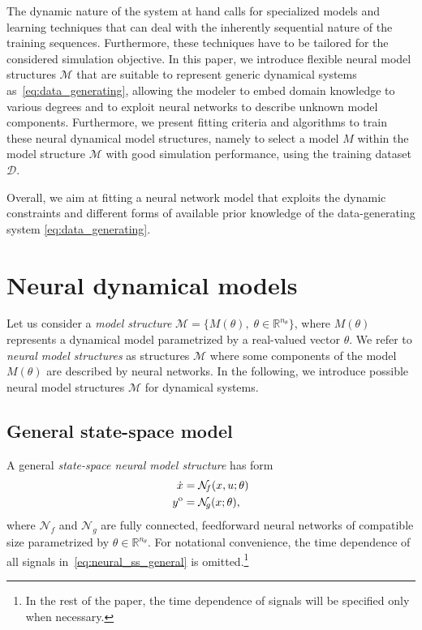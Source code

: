 \documentclass{article} %
\newcommand{\M}{{M}}             %
\newcommand{\MS}{\mathcal{M}}    %
\newcommand{\NN}{\mathcal{N}} %
\newcommand{\ntheta}{n_\theta}
\newcommand{\Did}{{\mathcal{D}}}
\newcommand{\ymodel}{y^{\rm o}}
\begin{document}
{The dynamic nature of the system at hand calls for specialized models and learning techniques that can deal with the inherently sequential nature of the training sequences. Furthermore, these techniques have to be tailored for the considered simulation objective}. In this paper, we introduce flexible neural model structures {$\mathcal{M}$} that are suitable to represent generic dynamical systems as~\eqref{eq:data_generating}, allowing the modeler to embed domain knowledge to various degrees and to exploit neural networks to describe unknown model components.
Furthermore, we present fitting criteria and algorithms to train these neural dynamical model structures, {namely to select a model $M$ within the model structure $\mathcal{M}$ with good simulation performance, using the training dataset $\Did$.}
 
Overall, we aim at fitting a neural network model that exploits the dynamic constraints and different forms of available prior  knowledge of the data-generating system \eqref{eq:data_generating}. 


\section{Neural dynamical models}
\label{sec:model_structure}
Let us consider a  \textit{model structure} $\MS = \{\M(\theta),\; \theta \in \mathbb{R}^{\ntheta}\}$, where $M(\theta)$ represents a dynamical model parametrized by a real-valued vector $\theta$.  We refer to \textit{neural model structures} as structures $\MS$ where some components of the model $M(\theta)$ are described by neural networks.
In the following, we introduce possible neural model structures  $\MS$ for dynamical systems. 

\subsection{General state-space model}
A general \emph{state-space neural  model structure} has form 
\begin{subequations}
\label{eq:neural_ss_general}
\begin{align}
 \dot x &= \NN_{\!f}(x, u; \theta) \label{eq:neural_ss_general_X}\\
 \ymodel &= \NN_{\!g}(x; \theta),
\end{align}
\end{subequations}
where $\NN_{\!f}$ and $\NN_{\!g}$ are {fully connected}, feedforward neural networks \cite{schmidhuber2015deep} of compatible size parametrized by $\theta \in \mathbb{R}^{\ntheta}$. For notational convenience, the time dependence of all signals  in~\eqref{eq:neural_ss_general}  is omitted.\footnote{In the rest of the paper, the time dependence of signals will be specified only when necessary.}
\end{document}

